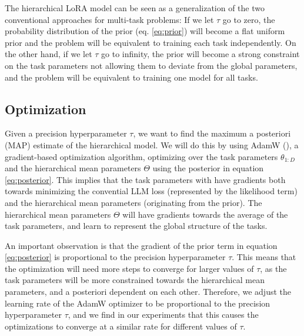 \documentclass[fullpaper]{nldl}
\begin{document}
The hierarchical LoRA model can be seen as a generalization of the two conventional approaches for multi-task problems:
If we let $\tau$ go to zero, the probability distribution of the prior (eq. \ref{eq:prior}) will become a flat uniform prior and the problem will be equivalent to training each task independently. On the other hand, if we let $\tau$ go to infinity, the prior will become a strong constraint on the task parameters not allowing them to deviate from the global parameters, and the problem will be equivalent to training one model for all tasks.

\subsection{Optimization}
Given a precision hyperparameter $\tau$, we want to find the maximum a posteriori (MAP) estimate of the hierarchical model. 
We will do this by using AdamW (\cite{adamW}), a gradient-based optimization algorithm, optimizing over the task parameters $\theta_{1:D}$ and the hierarchical mean parameters $\Theta$ using the posterior in equation \ref{eq:posterior}.
This implies that the task parameters with have gradients both towards minimizing the convential LLM loss (represented by the likelihood term) and the hierarchical mean parameters (originating from the prior). The hierarchical mean parameters $\Theta$ will have gradients towards the average of the task parameters, and learn to represent the global structure of the tasks.

An important observation is that the gradient of the prior term in equation \ref{eq:posterior} is proportional to the precision hyperparameter $\tau$. This means that the optimization will need more steps to converge for larger values of $\tau$, as the task parameters will be more constrained towards the hierarchical mean parameters, and a posteriori dependent on each other.
Therefore, we adjust the learning rate of the AdamW optimizer to be proportional to the precision hyperparameter $\tau$, and we find in our experiments that this causes the optimizations to converge at a similar rate for different values of $\tau$.
\end{document}
